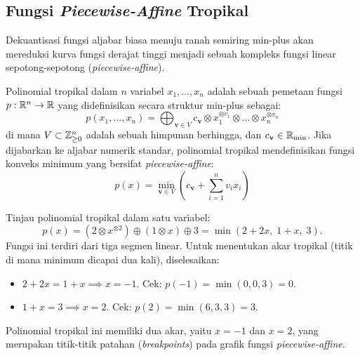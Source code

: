 \subsection{Fungsi \textit{Piecewise-Affine} Tropikal}
Dekuantisasi fungsi aljabar biasa menuju ranah semiring min-plus akan mereduksi kurva fungsi derajat tinggi menjadi sebuah kompleks fungsi linear sepotong-sepotong (\textit{piecewise-affine}).

\begin{definisi}
  Polinomial tropikal dalam $n$ variabel $x_1, \ldots, x_n$ adalah sebuah pemetaan fungsi $p: \mathbb{R}^n \to \mathbb{R}$ yang didefinisikan secara struktur min-plus sebagai:
  \[
    p(x_1, \ldots, x_n) = \bigoplus_{\mathbf{v} \in V} c_{\mathbf{v}} \otimes x_1^{\otimes v_1} \otimes \ldots \otimes x_n^{\otimes v_n}
  \]
  di mana $V \subset \mathbb{Z}_{\ge 0}^n$ adalah sebuah himpunan berhingga, dan $c_{\mathbf{v}} \in \mathbb{R}_{\min}$. Jika dijabarkan ke aljabar numerik standar, polinomial tropikal mendefinisikan fungsi konveks minimum yang bersifat \textit{piecewise-affine}:
  \[
    p(x) = \min_{\mathbf{v} \in V} \left( c_{\mathbf{v}} + \sum_{i=1}^n v_i x_i \right)
  \]
\end{definisi}

\begin{contoh}
  Tinjau polinomial tropikal dalam satu variabel:
  \[
    p(x) = (2 \otimes x^{\otimes 2}) \oplus (1 \otimes x) \oplus 3 = \min(2 + 2x,\; 1 + x,\; 3).
  \]
  Fungsi ini terdiri dari tiga segmen linear. Untuk menentukan akar tropikal (titik di mana minimum dicapai dua kali), diselesaikan:
  \begin{itemize}
    \item $2 + 2x = 1 + x \implies x = -1$. Cek: $p(-1) = \min(0, 0, 3) = 0$. \checkmark
    \item $1 + x = 3 \implies x = 2$. Cek: $p(2) = \min(6, 3, 3) = 3$. \checkmark
  \end{itemize}
  Polinomial tropikal ini memiliki dua akar, yaitu $x = -1$ dan $x = 2$, yang merupakan titik-titik patahan (\textit{breakpoints}) pada grafik fungsi \textit{piecewise-affine}.
\end{contoh}

